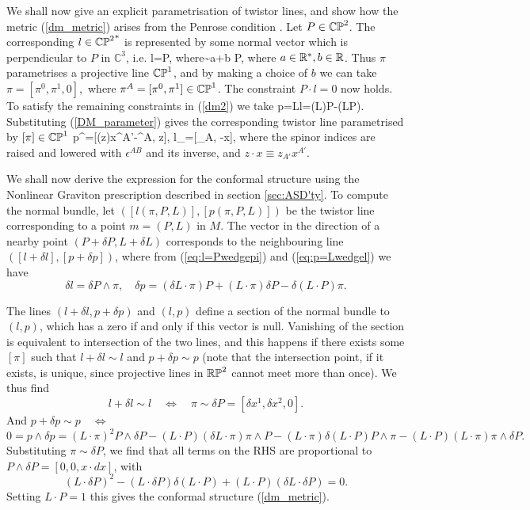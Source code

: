 We shall now give an explicit parametrisation of twistor lines, and show how 
the metric (\ref{dm_metric}) arises from the Penrose condition 
\cite{penrose, ward}.
Let $P\in \mathbb{CP}^2$. The corresponding $l\in {\mathbb{CP}^2}^*$ is represented by some normal vector which is perpendicular to $P$ in $\mathbb{C}^3$, i.e.
\be \label{eq:l=Pwedgepi}
l=P\wedge \pi, \quad \mbox{where}\quad  \pi\sim a\pi+b P,
\ee
where $a\in \mathbb{R}^*, b\in \mathbb{R}$.  Thus $\pi$ parametrises a projective line $\mathbb{CP}^1$,
and by making a choice of $b$ we can take
$
\pi=[\pi^0, \pi^1, 0], 
$ where $\pi^A=[\pi^0, \pi^1]\in \mathbb{CP}^1$. The constraint $P\cdot l=0$ now holds.
To satisfy the remaining constraints in (\ref{dm2}) we take
\be \label{eq:p=Lwedgel}
p=L\wedge l=(L\cdot\pi)P-(L\cdot P)\pi.
\ee
Substituting (\ref{DM_parameter}) gives 
the corresponding twistor line parametrised by $[\pi]\in\mathbb{CP}^1$ 
\be
\label{sl3curves}
p^{\alpha}=[(z\cdot \pi)x^{A'}-\pi^A, z\cdot \pi], \quad l_\alpha=[\pi_A, -\pi\cdot x],
\ee
where the spinor indices are raised and lowered with $\epsilon^{AB}$ and its inverse, and  $z\cdot x\equiv z_{A'}x^{A'}$. 

We shall now derive the expression for the conformal structure using the Nonlinear Graviton prescription described in section \ref{sec:ASD'ty}. To compute the normal bundle, let $([l(\pi, P, L)], 
[p(\pi, P, L)])$
be the twistor line corresponding to a point $m=(P, L)$ in $M$. The vector in the direction of a nearby point $(P+\delta P,L+\delta L)$ corresponds to the neighbouring line $([l+\delta l], [p+\delta p])$, where from (\ref{eq:l=Pwedgepi}) and (\ref{eq:p=Lwedgel}) we have
\[
\delta l=\delta P\wedge \pi, \quad
\delta p= (\delta L\cdot \pi)P+(L\cdot\pi) \delta P-\delta (L\cdot P)\pi.
\]

The lines  $(l+\delta l, p+\delta p)$  and $(l, p)$ define a section of the normal bundle to $(l,p)$, which has a zero if and only if this vector is null. Vanishing of the section is equivalent to intersection of the two lines, and this happens if there exists some $[\pi]$ such that $l+\delta l\sim l$ and $p+\delta p\sim p$ (note that the intersection point, if it exists, is unique, since projective lines in $\mathbb{RP}^2$ cannot meet more than once). We thus find
\[
l+\delta l\sim l \quad \iff \quad\pi\sim\delta P=[\delta x^1, \delta x^2, 0].
\]
And $p+\delta p\sim p \quad \iff$
\[
0=p\wedge \delta p=(L\cdot \pi)^2P\wedge \delta P-(L\cdot P)
(\delta L\cdot \pi)\pi\wedge P-(L\cdot \pi)\delta (L\cdot P)P\wedge \pi-
(L\cdot P)(L\cdot \pi) \pi\wedge \delta P.
\]
Substituting $\pi\sim\delta P$, we find that all terms on the RHS are proportional to $P\wedge \delta P=[0, 0, x\cdot dx]$, with
\[
(L\cdot \delta P)^2-(L\cdot \delta P)\delta(L\cdot P)+(L\cdot P)(\delta L\cdot \delta P)=0.
\]
Setting $L\cdot P=1$ this gives the conformal structure 
(\ref{dm_metric}).
